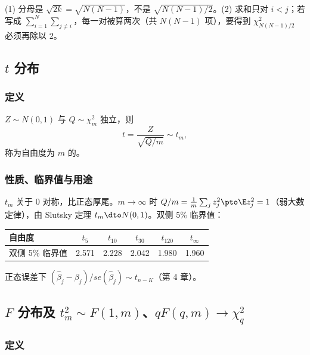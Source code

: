 \begin{note}[LM 标准化的两个易错点]
(1) 分母是 $\sqrt{2k}=\sqrt{N(N-1)}$，不是 $\sqrt{N(N-1)/2}$。(2) 求和只对 $i<j$；若写成 $\sum_{i=1}^N\sum_{j\ne i}$，每一对被算两次（共 $N(N-1)$ 项），要得到 $\chi^2_{N(N-1)/2}$ 必须再除以 2。
\end{note}

\subsection{\texorpdfstring{$t$}{t} 分布}

\subsubsection{定义}

\begin{defn}[$t$ 分布]\label{def:U01b-t}
$Z\sim N(0,1)$ 与 $Q\sim\chi^2_m$ 独立，则
\[
t=\frac{Z}{\sqrt{Q/m}}\sim t_m,
\]
称为自由度为 $m$ 的。
\end{defn}

\subsubsection{性质、临界值与用途}

$t_m$ 关于 0 对称，比正态厚尾。$m\to\infty$ 时 $Q/m=\frac1m\sum_jz_j^2\pto\E z_j^2=1$（弱大数定律），由 Slutsky 定理 $t_m\dto N(0,1)$。双侧 5\% 临界值：

\begin{center}
\small
\begin{tabular}{lccccc}
\toprule
自由度 & $t_5$ & $t_{10}$ & $t_{30}$ & $t_{120}$ & $t_\infty$\\
\midrule
双侧 5\% 临界值 & 2.571 & 2.228 & 2.042 & 1.980 & 1.960\\
\bottomrule
\end{tabular}
\end{center}
正态误差下 $(\hat\beta_j-\beta_j)/se(\hat\beta_j)\sim t_{n-K}$（第 4 章）。

\subsection{\texorpdfstring{$F$}{F} 分布及 \texorpdfstring{$t_m^2\sim F(1,m)$}{t\^2 ~ F(1,m)}、\texorpdfstring{$qF(q,m)\to\chi^2_q$}{qF(q,m) -> chi2(q)}}

\subsubsection{定义}

